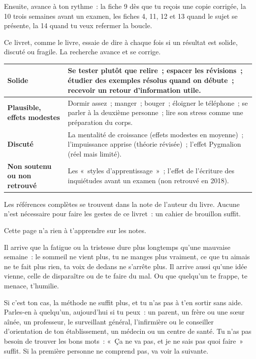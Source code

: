 \documentclass[10pt,twoside,openany]{book}
\newcommand{\titre}[1]{\clearpage\markright{#1}\thispagestyle{plain}{\noindent\LARGE\bfseries #1\par}\vspace{0.8em}}
\begin{document}
\vspace{0.8em}
Ensuite, avance à ton rythme : la fiche 9 dès que tu reçois une copie corrigée, la 10 trois semaines avant un examen, les fiches 4, 11, 12 et 13 quand le sujet se présente, la 14 quand tu veux refermer la boucle.

\titre{Ce qui est solide, ce qui l’est moins}
Ce livret, comme le livre, essaie de dire à chaque fois si un résultat est solide, discuté ou fragile. La recherche avance et se corrige.
\renewcommand{\arraystretch}{1.3}
\begin{tabularx}{\linewidth}{@{}>{\bfseries}p{2.6cm} X@{}}
\toprule
Solide & Se tester plutôt que relire ; espacer les révisions ; étudier des exemples résolus quand on débute ; recevoir un retour d’information utile.\\\midrule
Plausible, effets modestes & Dormir assez ; manger ; bouger ; éloigner le téléphone ; se parler à la deuxième personne ; lire son stress comme une préparation du corps.\\\midrule
Discuté & La mentalité de croissance (effets modestes en moyenne) ; l’impuissance apprise (théorie révisée) ; l’effet Pygmalion (réel mais limité).\\\midrule
Non soutenu ou non retrouvé & Les « styles d’apprentissage » ; l’effet de l’écriture des inquiétudes avant un examen (non retrouvé en 2018).\\\bottomrule
\end{tabularx}

\vspace{0.8em}
Les références complètes se trouvent dans la note de l’auteur du livre. Aucune n’est nécessaire pour faire les gestes de ce livret : un cahier de brouillon suffit.

\titre{Si ça ne va pas}
Cette page n’a rien à t’apprendre sur les notes.

Il arrive que la fatigue ou la tristesse dure plus longtemps qu’une mauvaise semaine : le sommeil ne vient plus, tu ne manges plus vraiment, ce que tu aimais ne te fait plus rien, ta voix de dedans ne s’arrête plus. Il arrive aussi qu’une idée vienne, celle de disparaître ou de te faire du mal. Ou que quelqu’un te frappe, te menace, t’humilie.

Si c’est ton cas, la méthode ne suffit plus, et tu n’as pas à t’en sortir sans aide. Parles-en à quelqu’un, aujourd’hui si tu peux : un parent, un frère ou une sœur aînée, un professeur, le surveillant général, l’infirmière ou le conseiller d’orientation de ton établissement, un médecin ou un centre de santé. Tu n’as pas besoin de trouver les bons mots : « Ça ne va pas, et je ne sais pas quoi faire » suffit. Si la première personne ne comprend pas, va voir la suivante.
\end{document}
